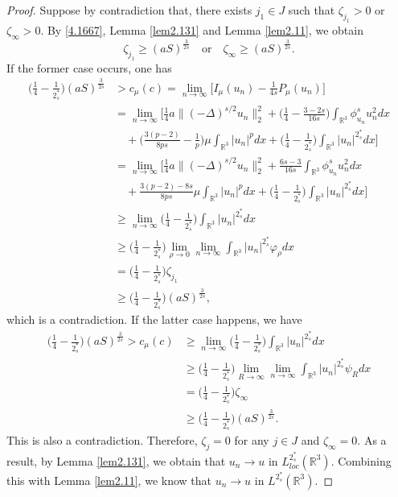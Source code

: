 \begin{proof}
 Suppose by contradiction that, there exists $j_1\in J$ such that $\zeta_{j_1}>0$ 
or $\zeta_\infty>0$.  By  \eqref{4.1667}, Lemma {\ref{lem2.131}} and  
Lemma  \ref{lem2.11}, we obtain
$$
\zeta_{j_1}\geq (aS)^{\frac{3}{2s}} \quad\text{or}\quad
\zeta_{\infty}\geq (aS)^{\frac{3}{2s}}.
$$
If the former case occurs, one has
\begin{align*}
\Big(\frac{1}{4}-\frac{1}{2^*_s}\Big)(aS)^{\frac{3}{2s}}
&>c_\mu(c)
=\lim_{n\to \infty}\Big[I_\mu(u_n)-\frac{1}{4s}P_\mu(u_n)\Big]\\
&=  \lim_{n\to \infty}\big[\frac{1}{4}a\|(-\Delta)^{s/2}u_n\|^2_2
 +\Big(\frac{1}{4}-\frac{3-2s}{16s}\Big)\int_{\mathbb{R}^3}\phi^s_{u_n}u^2_ndx\\
&\quad +\Big(\frac{3(p-2)}{8ps}-\frac{1}{p}\Big)
 \mu \int_{\mathbb{R}^3}|u_n|^pdx
 +\Big(\frac{1}{4}-\frac{1}{2^*_s}\Big)\int_{\mathbb{R}^3}|u_n|^{2^*_s}dx\Big]\\
&=  \lim_{n\to \infty}\Big[\frac{1}{4}a\|(-\Delta)^{s/2}u_n\|^2_2
 +\frac{6s-3}{16s}\int_{\mathbb{R}^3}\phi^s_{u_n}u^2_ndx\\
&\quad +\frac{3(p-2)-8s}{8ps}\mu \int_{\mathbb{R}^3}|u_n|^pdx+\Big(\frac{1}{4}
 -\frac{1}{2^*_s}\Big)\int_{\mathbb{R}^3}|u_n|^{2^*_s}dx\Big]\\
&\geq \lim_{n\to \infty}\Big(\frac{1}{4}-\frac{1}{2^*_s}\Big)
 \int_{\mathbb{R}^3}|u_n|^{2^*_s}dx\\
&\geq \Big(\frac{1}{4}-\frac{1}{2^*_s}\Big)\lim_{\rho\to 0}
 \lim_{n\to \infty}\int_{\mathbb{R}^3}|u_n|^{2^*_s}\varphi_\rho dx\\
&=  \Big(\frac{1}{4}-\frac{1}{2^*_s}\Big)\zeta_{j_1}\\
&\geq\Big(\frac{1}{4}-\frac{1}{2^*_s}\Big) (aS)^{\frac{3}{2s}},
\end{align*}
which is a contradiction. If the latter case happens, we have
\begin{align*}
\Big(\frac{1}{4}-\frac{1}{2^*_s}\Big)(aS)^{\frac{3}{2s}}>c_\mu(c)
&\geq \lim_{n\to \infty}\Big(\frac{1}{4}-\frac{1}{2^*_s}\Big)
 \int_{\mathbb{R}^3}|u_n|^{2^*_s}dx\\
&\geq \Big(\frac{1}{4}-\frac{1}{2^*_s}\Big)\lim_{R\to \infty}
 \lim_{n\to \infty}\int_{\mathbb{R}^3}|u_n|^{2^*_s}\psi_R dx\\
&= \Big(\frac{1}{4}-\frac{1}{2^*_s}\Big)\zeta_\infty \\
&\geq\Big(\frac{1}{4}-\frac{1}{2^*_s}\Big) (aS)^{\frac{3}{2s}}.
\end{align*}
This is also a contradiction. Therefore, $\zeta_j=0$ for any 
$j\in J$ and $\zeta_\infty=0$. As a result, by Lemma \ref{lem2.131}, 
we obtain that $u_n\to u$ in $L^{2^*_s}_{loc}(\mathbb{R}^3)$.
Combining this with   Lemma \ref{lem2.11}, we know that $u_n\to u$ in 
$L^{2^*_s}(\mathbb{R}^3)$.
\smallskip


\end{proof}
